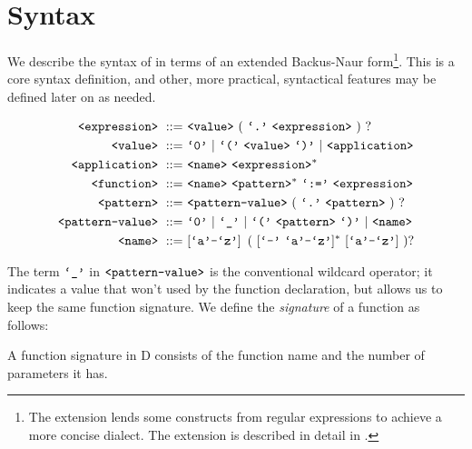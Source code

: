 \section{Syntax}\label{section:d-syntax}

We describe the syntax of \D in terms of an extended Backus-Naur
form\footnote{The extension lends some constructs from regular expressions to
achieve a more concise dialect. The extension is described in detail in
.}. This is a core syntax definition, and other, more
practical, syntactical features may be defined later on as needed.

\begin{align}
\nonterm{expression}\ ::=&\ \nonterm{value}\ (\ \term{.}\ \nonterm{expression}
\ )\ ?\\
\nonterm{value}\ ::=&\ \term{0}\ |\ \term{(}\ \nonterm{value}\ \term{)}\ |
\ \nonterm{application}\\
\nonterm{application}\ ::=&\ \nonterm{name}
\ \nonterm{expression}^*\\
\nonterm{function}\ ::=&\ \nonterm{name}\ \nonterm{pattern}^*
\ \term{:=}\ \nonterm{expression}\\
\nonterm{pattern}\ ::=&\ \nonterm{pattern-value}\ (\ \term{.}
\ \nonterm{pattern}\ )\ ?\\
\nonterm{pattern-value}\ ::=&\ \term{0}\ |\ \term{\_}\ |\ \term{(}
\ \nonterm{pattern}\ \term{)}\ |\ \nonterm{name}\\
\nonterm{name}\ ::=&\ [\term{a}\mathmono{-}\term{z}]
\ \left (\ [\term{-}\ \term{a}\mathmono{-}\term{z}]^*
\ [\term{a}\mathmono{-}\term{z}]\ \right )?
\end{align}

The term $\text{{\ttfamily`\_'}}$ in $\text{{\ttfamily<pattern-value>}}$ is the conventional wildcard
operator; it indicates a value that won't used by the function declaration, but
allows us to keep the same function signature. We define the \emph{signature}
of a function as follows:

\begin{definition}

A function signature in D consists of the function name and the number of
parameters it has.

\end{definition}


